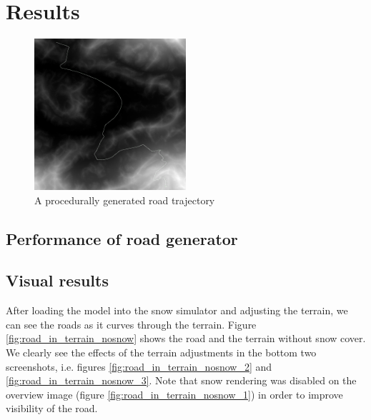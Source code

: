\chapter{Results}
\begin{figure}[ht]
\centering
\includegraphics[width=0.5\textwidth]{figure/generated_road_trajectory}
\caption{A procedurally generated road trajectory}
\label{fig:road_trajectory}
\end{figure}

\section{Performance of road generator}

\section{Visual results}
After loading the model into the snow simulator and adjusting the terrain, we can see the roads as it curves through the terrain. Figure \ref{fig:road_in_terrain_nosnow} shows the road and the terrain without snow cover. We clearly see the effects of the terrain adjustments in the bottom two screenshots, i.e. figures \ref{fig:road_in_terrain_nosnow_2} and \ref{fig:road_in_terrain_nosnow_3}. Note that snow rendering was disabled on the overview image (figure \ref{fig:road_in_terrain_nosnow_1}) in order to improve visibility of the road.

